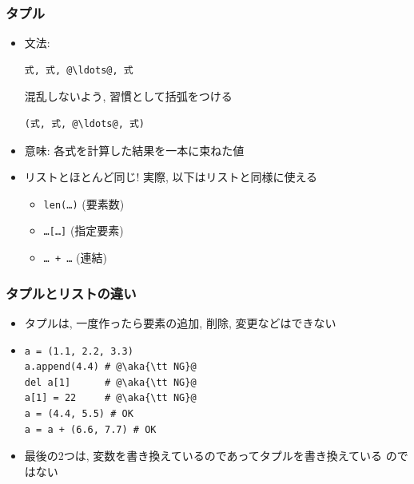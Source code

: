 \documentclass[10pt,dvipdfmx]{beamer}
\newcommand{\aka}[1]{{\color{red}#1}}
\begin{document}
\begin{frame}[fragile]
\frametitle{タプル}
\begin{itemize}
\item 文法:
\begin{lstlisting}
式, 式, @\ldots@, 式
\end{lstlisting}
混乱しないよう, 習慣として括弧をつける
\begin{lstlisting}
(式, 式, @\ldots@, 式)
\end{lstlisting}

\item 意味: 各式を計算した結果を一本に束ねた値
\item リストとほとんど同じ! 実際, 以下はリストと同様に使える
  \begin{itemize}
  \item {\tt len(\ldots)} (要素数)
  \item {\tt \ldots[\ldots]} (指定要素)
  \item {\tt \ldots\ + \ldots} (連結)
  \end{itemize}

\end{itemize}
\end{frame}

\begin{frame}[fragile]
\frametitle{タプルとリストの違い}
\begin{itemize}
\item タプルは, 一度作ったら要素の追加, 削除, 変更などはできない
\item 
\begin{lstlisting}
a = (1.1, 2.2, 3.3)
a.append(4.4) # @\aka{\tt NG}@
del a[1]      # @\aka{\tt NG}@
a[1] = 22     # @\aka{\tt NG}@
a = (4.4, 5.5) # OK
a = a + (6.6, 7.7) # OK
\end{lstlisting}
\item 最後の2つは, 変数を書き換えているのであってタプルを書き換えている
  のではない
\end{itemize}
\end{frame}
\end{document}
